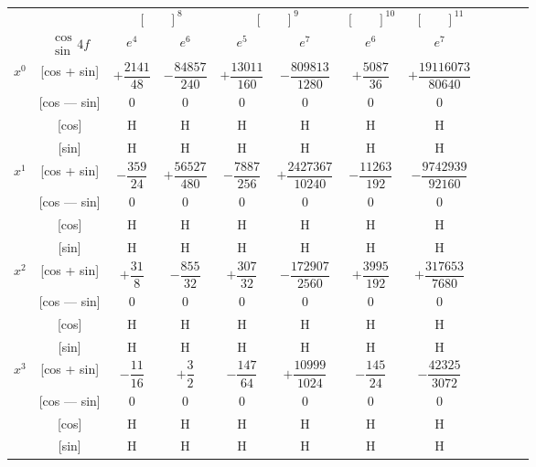 \documentclass[11pt,a4paper]{book}
\begin{document}
{{\begin{center}
\small
\begin{tabular}{|c|c|c|c|c|c|c|c|c|c|c|c|}
\hline
& & \multicolumn{2}{c|}{$[\phantom{()}]^8$} & \multicolumn{2}{c|}{$[\phantom{()}]^9$} & \multicolumn{1}{c|}{$[\phantom{()}]^{10}$} & \multicolumn{1}{c|}{$[\phantom{()}]^{11}$} \\
\cline{3-8}
& $\begin{smallmatrix} \cos \\ \sin \end{smallmatrix} 4f$ & $e^4$ & $e^6$ & $e^5$ & $e^7$ & $e^6$ & $e^7$ \\
\hline
\multirow{4}{*}{$x^0$} & [cos + sin] & $+\dfrac{2141}{48}$ & $-\dfrac{84857}{240}$ & $+\dfrac{13011}{160}$ & $-\dfrac{809813}{1280}$ & $+\dfrac{5087}{36}$ & $+\dfrac{19116073}{80640}$ \\
& [cos --- sin] & $0$ & $0$ & $0$ & $0$ & $0$ & $0$ \\
& [cos] & H & H & H & H & H & H \\
& [sin] & H & H & H & H & H & H \\
\hline
\multirow{4}{*}{$x^1$} & [cos + sin] & $-\dfrac{359}{24}$ & $+\dfrac{56527}{480}$ & $-\dfrac{7887}{256}$ & $+\dfrac{2427367}{10240}$ & $-\dfrac{11263}{192}$ & $-\dfrac{9742939}{92160}$ \\
& [cos --- sin] & $0$ & $0$ & $0$ & $0$ & $0$ & $0$ \\
& [cos] & H & H & H & H & H & H \\
& [sin] & H & H & H & H & H & H \\
\hline
\multirow{4}{*}{$x^2$} & [cos + sin] & $+\dfrac{31}{8}$ & $-\dfrac{855}{32}$ & $+\dfrac{307}{32}$ & $-\dfrac{172907}{2560}$ & $+\dfrac{3995}{192}$ & $+\dfrac{317653}{7680}$ \\
& [cos --- sin] & $0$ & $0$ & $0$ & $0$ & $0$ & $0$ \\
& [cos] & H & H & H & H & H & H \\
& [sin] & H & H & H & H & H & H \\
\hline
\multirow{4}{*}{$x^3$} & [cos + sin] & $-\dfrac{11}{16}$ & $+\dfrac{3}{2}$ & $-\dfrac{147}{64}$ & $+\dfrac{10999}{1024}$ & $-\dfrac{145}{24}$ & $-\dfrac{42325}{3072}$ \\
& [cos --- sin] & $0$ & $0$ & $0$ & $0$ & $0$ & $0$ \\
& [cos] & H & H & H & H & H & H \\
& [sin] & H & H & H & H & H & H \\
\hline
\end{tabular}
\end{center}

}}
\end{document}
